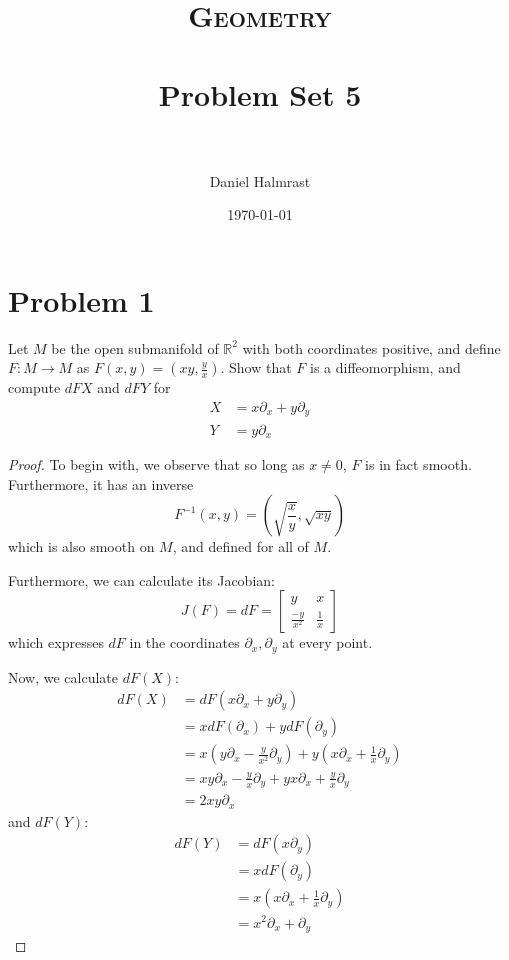 \documentclass[fontsize=11pt]{scrartcl} %
\title{	
\normalfont \normalsize 
\textsc{Geometry} \\ [25pt] %
\horrule{0.5pt} \\[0.4cm] %
\huge Problem Set 5 \\ %
\horrule{2pt} \\[0.5cm] %
}
\author{Daniel Halmrast} %
\date{\normalsize\today} %
\numberwithin{equation}{section} %
\numberwithin{figure}{section} %
\numberwithin{table}{section} %
\newcommand{\R}{\mathbb{R}}
\begin{document}
\maketitle %


\section*{Problem 1} %
Let $M$ be the open submanifold of $\R^2$ with both coordinates positive, and
define $F:M\to M$ as $F(x,y) = (xy,\frac{y}{x})$. Show that $F$ is a
diffeomorphism, and compute $dFX$ and $dFY$ for
\[
    \begin{aligned}
        X &= x\partial_x + y\partial_y\\
        Y &= y\partial_x
    \end{aligned}
\]

\begin{proof}
To begin with, we observe that so long as $x\neq 0$, $F$ is in fact smooth.
    Furthermore, it has an inverse
    \[
        F^{-1}(x,y) = (\sqrt{\frac{x}{y}},\sqrt{xy})
    \]
    which is also smooth on $M$, and defined for all of $M$.
    
    Furthermore, we can calculate its Jacobian:
    \[
        J(F) = dF =
        \begin{bmatrix}
            y & x\\
            \frac{-y}{x^2} & \frac{1}{x}
        \end{bmatrix}
    \]
    which expresses $dF$ in the coordinates $\partial_x,\partial_y$ at every
    point.

    Now, we calculate $dF(X)$:
    \[
        \begin{aligned}
            dF(X) &= dF(x\partial_x + y\partial_y)\\
                &= xdF(\partial_x) + ydF(\partial_y)\\
                &= x(y\partial_x - \frac{y}{x^2}\partial_y) + y(x\partial_x +
                \frac{1}{x}\partial_y)\\
                &= xy\partial_x - \frac{y}{x}\partial_y + yx\partial_x
                +\frac{y}{x}\partial_y\\
                &= 2xy\partial_x
        \end{aligned}
    \]
    and $dF(Y)$:
    \[
        \begin{aligned}
            dF(Y) &= dF(x\partial_y)\\
                  &= xdF(\partial_y)\\
                  &= x(x\partial_x + \frac{1}{x}\partial_y)\\
                  &=x^2\partial_x + \partial_y
        \end{aligned}
    \]
\end{proof}
\end{document}
